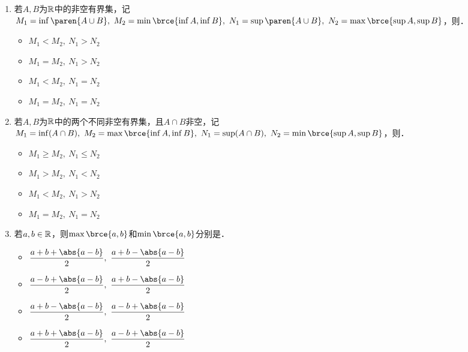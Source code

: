 \documentclass[a4paper,punct=CCT]{ctexbook}
\theoremstyle{definition}
\theoremstyle{remark}
\newif\ifshowsol
\let\leq\leqslant
\let\le\leq
\let\geq\geqslant
\let\ge\geq}
\begin{document}
\begin{enumerate}
\item 若\(A, B\)为\(\mathbb{R}\)中的非空有界集，记\(M_1 = \inf\paren{A \cup B},\ M_2 = \min\brce{\inf A, \inf B},\ N_1 = \sup\paren{A \cup B},\ N_2 = \max\brce{\sup A, \sup B}\)，则\uline{\makebox[4em]{}}．
  \begin{itemize}
    \renewcommand{\labelitemi}{\faCircleThin}
  \item \(M_1 < M_2,\ N_1 > N_2\)
  \item \(M_1 = M_2,\ N_1 > N_2\)
  \item \(M_1 < M_2,\ N_1 = N_2\)
    \ifshowsol
  \item[\faCircle] \(M_1 = M_2,\ N_1 = N_2\)
    \else
  \item \(M_1 = M_2,\ N_1 = N_2\)
    \fi
  \end{itemize}

\item 若\(A, B\)为\(\mathbb{R}\)中的两个不同非空有界集，且\(A \cap B\)非空，记\(M_1 = \inf(A \cap B),\ M_2 = \max\brce{\inf A, \inf B},\ N_1 = \sup(A \cap B),\ N_2 = \min\brce{\sup A, \sup B}\)，则\uline{\makebox[4em]{}}．
  \begin{itemize}
    \renewcommand{\labelitemi}{\faCircleThin}
    \ifshowsol
  \item[\faCircle] \(M_1 \ge M_2,\ N_1 \le N_2\)
    \else
  \item \(M_1 \ge M_2,\ N_1 \le N_2\)
    \fi
  \item \(M_1 > M_2,\ N_1 < N_2\)
  \item \(M_1 < M_2,\ N_1 > N_2\)
  \item \(M_1 = M_2,\ N_1 = N_2\)
  \end{itemize}

\item 若\(a, b \in \mathbb{R}\)，则\(\max\brce{a, b}\)和\(\min\brce{a, b}\)分别是\uline{\makebox[4em]{}}．
  \begin{itemize}
    \renewcommand{\labelitemi}{\faCircleThin}
    \ifshowsol
  \item[\faCircle] \(\displaystyle \frac{a+b+\abs{a-b}}{2},\ \frac{a+b-\abs{a-b}}{2}\)
    \else
  \item \(\displaystyle \frac{a+b+\abs{a-b}}{2},\ \frac{a+b-\abs{a-b}}{2}\)
    \fi
  \item \(\displaystyle \frac{a-b+\abs{a-b}}{2},\ \frac{a+b-\abs{a-b}}{2}\)
  \item \(\displaystyle \frac{a+b-\abs{a-b}}{2},\ \frac{a-b+\abs{a-b}}{2}\)
  \item \(\displaystyle \frac{a+b+\abs{a-b}}{2},\ \frac{a-b+\abs{a-b}}{2}\)
  \end{itemize}


\end{enumerate}
\end{document}
